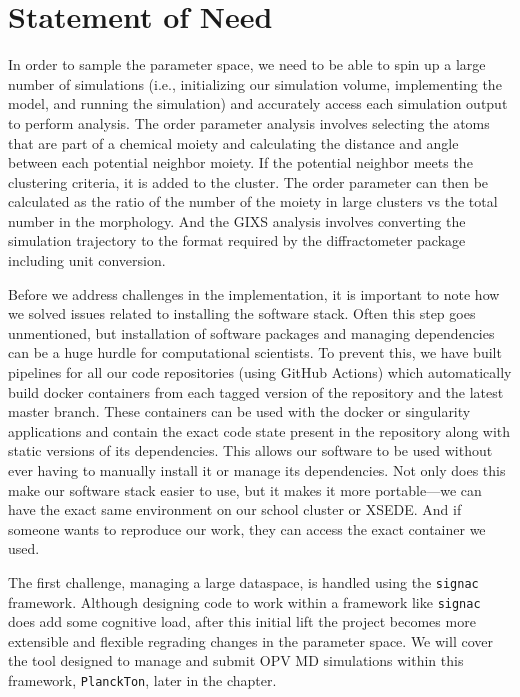\section{Statement of Need}

In order to sample the parameter space, we need to be able to spin up a large number of simulations (i.e., initializing our simulation volume, implementing the model, and running the simulation) and accurately access each simulation output to perform analysis.
The order parameter analysis involves selecting the atoms that are part of a chemical moiety and calculating the distance and angle between each potential neighbor moiety. 
If the potential neighbor meets the clustering criteria, it is added to the cluster.
The order parameter can then be calculated as the ratio of the number of the moiety in large clusters vs the total number in the morphology.
And the GIXS analysis involves converting the simulation trajectory to the format required by the diffractometer package including unit conversion.

Before we address challenges in the implementation, it is important to note how we solved issues related to installing the software stack.
Often this step goes unmentioned, but installation of software packages and managing dependencies can be a huge hurdle for computational scientists. 
To prevent this, we have built pipelines for all our code repositories (using GitHub Actions) which automatically build docker containers from each tagged version of the repository and the latest master branch. 
These containers can be used with the docker or singularity applications and contain the exact code state present in the repository along with static versions of its dependencies.
This allows our software to be used without ever having to manually install it or manage its dependencies. 
Not only does this make our software stack easier to use, but it makes it more portable---we can have the exact same environment on our school cluster or XSEDE.
And if someone wants to reproduce our work, they can access the exact container we used.

The first challenge, managing a large dataspace, is handled using the \texttt{signac} framework. Although designing code to work within a framework like \texttt{signac} does add some cognitive load, after this initial lift the project becomes more extensible and flexible regrading changes in the parameter space. We will cover the tool designed to manage and submit OPV MD simulations within this framework, \texttt{PlanckTon}, later in the chapter.

